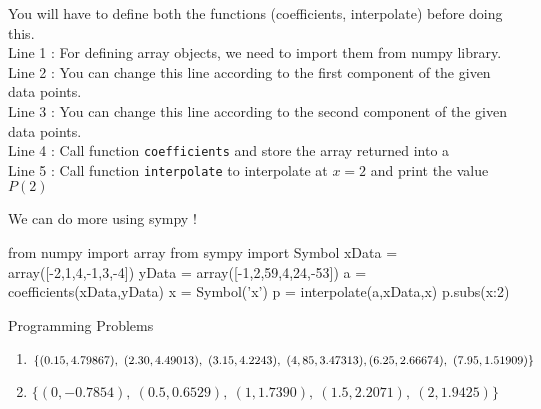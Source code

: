 \begin{remark}
\begin{commentary}
	You will have to define both the functions (coefficients, interpolate) before doing this.\\

	Line 1 : For defining array objects, we need to import them from numpy library.\\

	Line 2 : You can change this line according to the first component of the given data points.\\

	Line 3 : You can change this line according to the second component of the given data points.\\

	Line 4 : Call function \texttt{coefficients} and store the array returned into a\\

	Line 5 : Call function \texttt{interpolate} to interpolate at $x = 2$ and print the value $P(2)$
\end{commentary}
\end{remark}

\begin{program}
	We can do more using sympy !
	\begin{python}
		from numpy import array
		from sympy import Symbol
		xData = array([-2,1,4,-1,3,-4])
		yData = array([-1,2,59,4,24,-53])
		a = coefficients(xData,yData)
		x = Symbol('x')
		p = interpolate(a,xData,x)
		p.subs({x:2})
	\end{python}
\end{program}

\begin{remark}
	Programming Problems
	\begin{enumerate}
		\item $\{(0.15,4.79867),\ (2.30,4.49013),\ (3.15,4.2243),\ (4,85,3.47313),\\ (6.25,2.66674),\ (7.95,1.51909)\}$ \cite[Example 3.4]{kiusalaas}
		\item $\{(0,-0.7854),\ (0.5,0.6529),\ (1,1.7390),\ (1.5,2.2071),\ (2,1.9425)\}$\\ \cite[Problem Set 3.1.5]{kiusalaas}
	\end{enumerate}
\end{remark}

